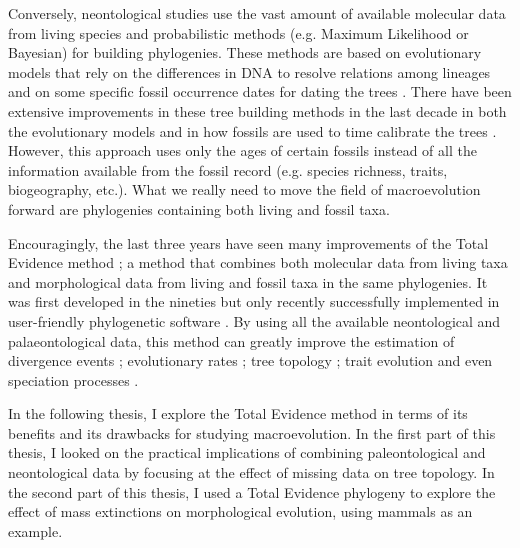 Conversely, neontological studies use the vast amount of available molecular data from living species and probabilistic methods (e.g. Maximum Likelihood or Bayesian) for building phylogenies.
These methods are based on evolutionary models that rely on the differences in DNA to resolve relations among lineages and on some specific fossil occurrence dates for dating the trees \citep[i.e. the molecular clock;][]{zuckerkandl1965}.
There have been extensive improvements in these tree building methods in the last decade in both the evolutionary models \citep[e.g.][]{bapsta2013,stadlerdating2013,heaththe2013} and in how fossils are used to time calibrate the trees \citep{Donoghue2007424,Parham01032012}.
However, this approach uses only the ages of certain fossils instead of all the information available from the fossil record (e.g. species richness, traits, biogeography, etc.).
What we really need to move the field of macroevolution forward are phylogenies containing both living and fossil taxa.

Encouragingly, the last three years have seen many improvements of the Total Evidence method \citep{ronquista2012,slaterphylogenetic2013,Wood01032013,schragocombining2013,beckancient2014,Arcila2015131,Dembo2015}; a method that combines both molecular data from living taxa and morphological data from living and fossil taxa in the same phylogenies.
It was first developed in the nineties \citep{eernissetaxonomic1993} but only recently successfully implemented in user-friendly phylogenetic software \citep{Ronquist2012mrbayes,BEAST2}.
By using all the available neontological and palaeontological data, this method can greatly improve the estimation of divergence events \citep[e.g.][]{ronquista2012}; evolutionary rates \citep[e.g.][]{beckancient2014}; tree topology \citep[e.g.][]{Dembo2015}; trait evolution \citep[e.g.][]{slaterphylogenetic2013} and even speciation processes \citep[e.g.][]{Wood01032013}.

In the following thesis, I explore the Total Evidence method in terms of its benefits and its drawbacks for studying macroevolution.
In the first part of this thesis, I looked on the practical implications of combining paleontological and neontological data by focusing at the effect of missing data on tree topology.
In the second part of this thesis, I used a Total Evidence phylogeny to explore the effect of mass extinctions on morphological evolution, using mammals as an example.

